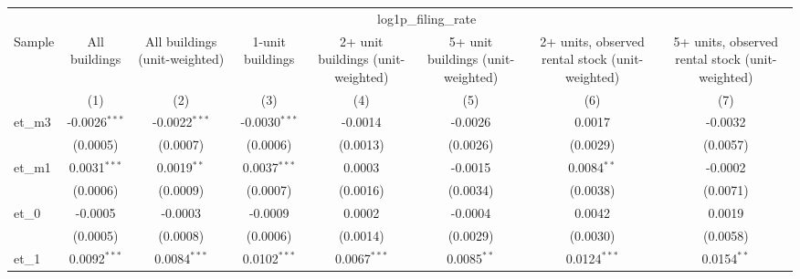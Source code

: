 
\begingroup
\centering
\begin{tabular}{lccccccc}
   \toprule
    & \multicolumn{7}{c}{log1p\_filing\_rate}\\
   Sample             & All buildings   & All buildings (unit-weighted) & 1-unit buildings & 2+ unit buildings (unit-weighted) & 5+ unit buildings (unit-weighted) & 2+ units, observed rental stock (unit-weighted) & 5+ units, observed rental stock (unit-weighted) \\   
                      & (1)             & (2)                           & (3)              & (4)                               & (5)                               & (6)                                             & (7)\\  
   \midrule 
   et\_m3             & -0.0026$^{***}$ & -0.0022$^{***}$               & -0.0030$^{***}$  & -0.0014                           & -0.0026                           & 0.0017                                          & -0.0032\\   
                      & (0.0005)        & (0.0007)                      & (0.0006)         & (0.0013)                          & (0.0026)                          & (0.0029)                                        & (0.0057)\\   
   et\_m1             & 0.0031$^{***}$  & 0.0019$^{**}$                 & 0.0037$^{***}$   & 0.0003                            & -0.0015                           & 0.0084$^{**}$                                   & -0.0002\\   
                      & (0.0006)        & (0.0009)                      & (0.0007)         & (0.0016)                          & (0.0034)                          & (0.0038)                                        & (0.0071)\\   
   et\_0              & -0.0005         & -0.0003                       & -0.0009          & 0.0002                            & -0.0004                           & 0.0042                                          & 0.0019\\   
                      & (0.0005)        & (0.0008)                      & (0.0006)         & (0.0014)                          & (0.0029)                          & (0.0030)                                        & (0.0058)\\   
   et\_1              & 0.0092$^{***}$  & 0.0084$^{***}$                & 0.0102$^{***}$   & 0.0067$^{***}$                    & 0.0085$^{**}$                     & 0.0124$^{***}$                                  & 0.0154$^{**}$\\   

\end{tabular}
